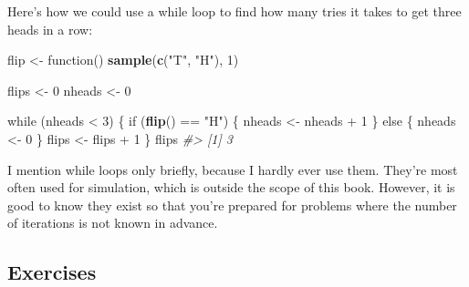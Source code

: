 \documentclass[]{book}
\newenvironment{Shaded}{\begin{snugshade}}{\end{snugshade}}
\newcommand{\KeywordTok}[1]{\textcolor[rgb]{0.13,0.29,0.53}{\textbf{{#1}}}}
\newcommand{\DecValTok}[1]{\textcolor[rgb]{0.00,0.00,0.81}{{#1}}}
\newcommand{\StringTok}[1]{\textcolor[rgb]{0.31,0.60,0.02}{{#1}}}
\newcommand{\CommentTok}[1]{\textcolor[rgb]{0.56,0.35,0.01}{\textit{{#1}}}}
\newcommand{\NormalTok}[1]{{#1}}
\begin{document}
Here's how we could use a while loop to find how many tries it takes to
get three heads in a row:

\begin{Shaded}
\begin{Highlighting}[]
\NormalTok{flip <-}\StringTok{ }\NormalTok{function() }\KeywordTok{sample}\NormalTok{(}\KeywordTok{c}\NormalTok{(}\StringTok{"T"}\NormalTok{, }\StringTok{"H"}\NormalTok{), }\DecValTok{1}\NormalTok{)}

\NormalTok{flips <-}\StringTok{ }\DecValTok{0}
\NormalTok{nheads <-}\StringTok{ }\DecValTok{0}

\NormalTok{while (nheads <}\StringTok{ }\DecValTok{3}\NormalTok{) \{}
  \NormalTok{if (}\KeywordTok{flip}\NormalTok{() ==}\StringTok{ "H"}\NormalTok{) \{}
    \NormalTok{nheads <-}\StringTok{ }\NormalTok{nheads +}\StringTok{ }\DecValTok{1}
  \NormalTok{\} else \{}
    \NormalTok{nheads <-}\StringTok{ }\DecValTok{0}
  \NormalTok{\}}
  \NormalTok{flips <-}\StringTok{ }\NormalTok{flips +}\StringTok{ }\DecValTok{1}
\NormalTok{\}}
\NormalTok{flips}
\CommentTok{#> [1] 3}
\end{Highlighting}
\end{Shaded}

I mention while loops only briefly, because I hardly ever use them.
They're most often used for simulation, which is outside the scope of
this book. However, it is good to know they exist so that you're
prepared for problems where the number of iterations is not known in
advance.

\subsection{Exercises}\label{exercises-56}
\end{document}
